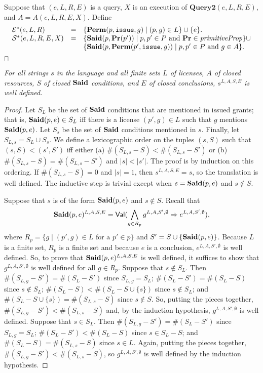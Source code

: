 \documentclass{acmtrans2m}
\newcommand{\dfn}{\begin{definition}}
\newcommand{\prf}{\begin{proof}}
\newcommand{\edfn}{\bbox\end{definition}}
\newcommand{\eprf}{\end{proof}}
\newcommand{\wbox}{\mbox{$\sqcap$\llap{$\sqcup$}}}
\newcommand{\bbox}{\wbox}
\newenvironment{RETHM}[2]{\trivlist \item[\hskip 10pt\hskip\labelsep{\sc #1\hskip 5pt\relax\ref{#2}.}]\it}{\endtrivlist}
\newcommand{\rethm}[1]{\begin{RETHM}{Theorem}{#1}}
\newcommand{\erethm}{\end{RETHM}}
\newcommand{\rimp}{\Rightarrow}
\newcommand{\othm}{\rethm}
\newcommand{\eothm}{\erethm}
\newcommand{\<}{
}
\renewcommand{\>}{\rangle}
\newcommand{\union}{\cup}
\newcommand{\len}[1]{|#1|}
\newcommand{\card}[1]{\#({#1})}
\newcommand{\Said}{\mathit{\bf Said}}
\newcommand{\Permitted}{\mathit{\bf Perm}}
\newcommand{\scd}{S}
\newcommand{\cc}{e}
\newcommand{\scc}{E}
\newcommand{\issue}{\mathtt{issue}}
\newcommand{\primitiveProp}{\mathit{primitiveProp}}
\newcommand{\XProcTwo}{\textbf{Query2}}
\newcommand{\Val}{\mathsf{Val}}
\newcommand{\transwithE}[5]{#1^{#2, #3, #4, #5}}
\newcommand{\tranwithE}[1]{#1^{L, A, \scd, \scc}}
\newcommand{\EStar}{{\cal E}^*}
\newcommand{\SStar}{{\cal S}^*}
\newcommand{\pred}[1]{\mathbf{#1}}
\newcommand{\EX}{X}
\begin{document}
\dfn
Suppose that $(\cc, L, R, \scc)$ is a query,
$\EX$ is an execution of $\XProcTwo(\cc, L, R, \scc)$, and
$A = A(\cc, L, R, \scc, \EX)$.
Define
\[
\begin{array}{lll}
\EStar(\cc, L, R) &=& \{\Permitted(p, \issue, g)\mid (p,g)\in L\}\union\{\cc\}.\\
\SStar(\cc, L, R, \scc, \EX) &=& \{\Said(p, \pred{Pr}(p'))\mid p, p'\in P\mbox{ and }
\pred{Pr}\in\primitiveProp\}\union\\
&&\{\Said(p, \Permitted(p', \issue, g))\mid p, p'\in P\mbox{ and }g\in A\}.
\end{array}
\]
\edfn

\othm{t:trans1}
For all strings $s$ in the language and all finite sets $L$ of licenses, $A$ of closed
resources, $\scd$ of closed $\Said$ conditions, and $\scc$ of closed conclusions,
$\tranwithE{s}$ is well defined.
\eothm
\prf
Let $S_L$ be the set of $\Said$ conditions that are mentioned in issued grants; that is,
$\Said(p, \cc)\in S_L$ iff there is a license $(p', g) \in L$ such that $g$ mentions
$\Said(p, \cc)$.  Let $S_s$ be the set of $\Said$ conditions mentioned in $s$.  Finally,
let $S_{L,s} = S_L\union S_s$.  We define a lexicographic order on the tuples $(s, S)$
such that $(s, S) < (s', S')$ iff either (a) $\card{S_{L,s}-S} < \card{S_{L,s}-S'}$ or
(b) $\card{S_{L,s}-S} = \card{S_{L,s}-S'}$ and $\len{s}<\len{s'}$.  The proof is by
induction on this ordering.  If $\card{S_{L,s}-S} = 0$ and $\len{s}=1$, then
$\tranwithE{s} = s$, so the translation is well defined.  The inductive step is trivial
except when $s = \Said(p, \cc)$ and $s\not\in S$.

Suppose that $s$ is of the form $\Said(p, \cc)$ and $s\not\in S$.  Recall that
$$
\tranwithE{\Said(p, \cc)} = \Val(\bigwedge_{g\in R_p}\transwithE{g}{L}{A}{\scd'}{\emptyset}
\rimp \transwithE{\cc}{L}{A}{\scd'}{\emptyset}),
$$
where $R_p = \{g \mid (p', g)\in L \mbox{ for a }p'\in p\}$ and
$\scd' = S \union\{\Said(p, \cc)\}$.  Because $L$ is a finite set, $R_p$ is a finite set
and because $\cc$ is a conclusion, $\transwithE{\cc}{L}{A}{\scd'}{\emptyset}$ is well
defined.  So, to prove that $\tranwithE{\Said(p, \cc)}$ is well defined, it suffices to
show that $\transwithE{g}{L}{A}{\scd'}{\emptyset}$ is well defined for all $g\in R_p$.
Suppose that $s\not\in S_L$.  Then $\card{S_{L,g} - S'} = \card{S_{L} - S'}$ since
$S_{L, g} = S_L$; $\card{S_{L} - S'} = \card{S_L - S}$ since $s\not\in S_L$;
$\card{S_L - S} < \card{S_L - S \union \{s\}}$ since $s \not\in S_L$; and
$\card{S_L - S \union \{s\}} = \card{S_{L,s}- S}$ since $s\not\in S$.  So, putting
the pieces together, $\card{S_{L,g} - S'} < \card{S_{L,s}- S}$ and, by the induction
hypothesis, $\transwithE{g}{L}{A}{\scd'}{\emptyset}$ is well defined.
Suppose that $s\in S_L$.  Then $\card{S_{L,g} - S'} = \card{S_L - S'}$ since
$S_{L, g} = S_L$; $\card{S_L - S'} < \card{S_L - S}$ since $s\in S_L - S$; and
$\card{S_L - S} = \card{S_{L, s} - S}$ since $s \in L$.  Again, putting the pieces
together, $\card{S_{L,g} - S'} < \card{S_{L,s}- S}$, so
$\transwithE{g}{L}{A}{\scd'}{\emptyset}$ is well defined by the induction hypothesis.
\eprf
\end{document}
